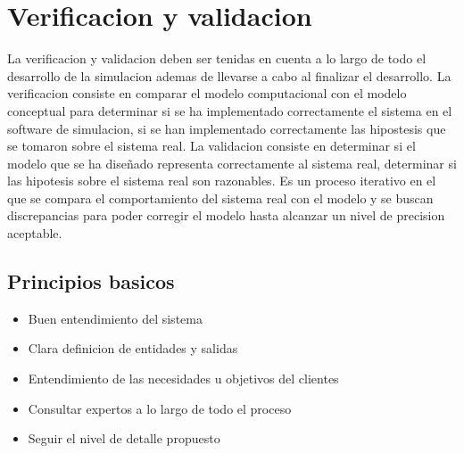 \documentclass[a4paper]{article}
\begin{document}
\section*{Verificacion y validacion}
La verificacion y validacion deben ser tenidas en cuenta a lo largo de todo el desarrollo de la simulacion 
ademas de llevarse a cabo al finalizar el desarrollo. 
La verificacion consiste en comparar el modelo computacional con el modelo conceptual para determinar si 
se ha implementado correctamente el sistema en el software de simulacion, si se han implementado correctamente las 
hipostesis que se tomaron sobre el sistema real.
La validacion consiste en determinar si el modelo que se ha diseñado representa correctamente al sistema 
real, determinar si las hipotesis sobre el sistema real son razonables. Es un proceso iterativo en el que se 
compara el comportamiento del sistema real con el modelo y 
se buscan discrepancias para poder corregir el modelo hasta alcanzar un nivel de precision aceptable.

\subsection*{Principios basicos}
\begin{itemize}
    \item Buen entendimiento del sistema
    \item Clara definicion de entidades y salidas
    \item Entendimiento de las necesidades u objetivos del clientes
    \item Consultar expertos a lo largo de todo el proceso
    \item Seguir el nivel de detalle propuesto
\end{itemize}
\end{document}
